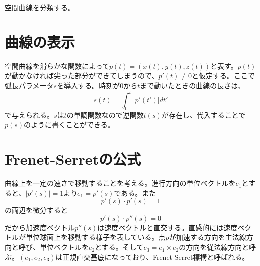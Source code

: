 
空間曲線を分類する。

\section{曲線の表示}
    空間曲線を滑らかな関数によって$p(t) = (x(t), y(t), z(t))$と表す。$p(t)$が動かなければ尖った部分ができてしまうので、$p'(t) \neq 0$と仮定する。ここで弧長パラメータ$s$を導入する。時刻が0から$t$まで動いたときの曲線の長さは、
        \[s(t) = \int_0^t |p'(t')|dt'\]
    で与えられる。$s$は$t$の単調関数なので逆関数$t(s)$が存在し、代入することで$p(s)$のように書くことができる。

\section{Frenet-Serretの公式}
    曲線上を一定の速さで移動することを考える。進行方向の単位ベクトルを$e_1$とすると、$|p'(s)| = 1$より$e_1 = p'(s)$である。また
        \[p'(s) \cdot p'(s) = 1\]
    の両辺を微分すると
        \[p'(s) \cdot p''(s) = 0\]
    だから加速度ベクトル$p''(s)$は速度ベクトルと直交する。直感的には速度ベクトルが単位球面上を移動する様子を表している。点$p$が加速する方向を主法線方向と呼び、単位ベクトルを$e_2$とする。そして$e_3 = e_1\times e_2$の方向を従法線方向と呼ぶ。$(e_1, e_2, e_3)$は正規直交基底になっており、Frenet-Serret標構と呼ばれる。

